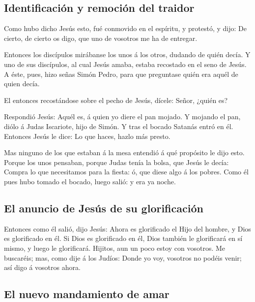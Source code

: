\hypertarget{identificaciuxf3n-y-remociuxf3n-del-traidor}{%
\subsection{Identificación y remoción del
traidor}\label{identificaciuxf3n-y-remociuxf3n-del-traidor}}

 Como hubo dicho Jesús esto, fué conmovido en el
espíritu, y protestó, y dijo: De cierto, de cierto os digo, que uno de
vosotros me ha de entregar.

 Entonces los discípulos mirábanse los unos á los otros,
dudando de quién decía.  Y uno de sus discípulos, al cual
Jesús amaba, estaba recostado en el seno de Jesús.  A
éste, pues, hizo señas Simón Pedro, para que preguntase quién era aquél
de quien decía.

 El entonces recostándose sobre el pecho de Jesús,
dícele: Señor, ¿quién es?

 Respondió Jesús: Aquél es, á quien yo diere el pan
mojado. Y mojando el pan, diólo á Judas Iscariote, hijo de Simón.
 Y tras el bocado Satanás entró en él. Entonces Jesús le
dice: Lo que haces, hazlo más presto.

 Mas ninguno de los que estaban á la mesa entendió á qué
propósito le dijo esto.  Porque los unos pensaban, porque
Judas tenía la bolsa, que Jesús le decía: Compra lo que necesitamos para
la fiesta: ó, que diese algo á los pobres.  Como él pues
hubo tomado el bocado, luego salió: y era ya noche.

\hypertarget{el-anuncio-de-jesuxfas-de-su-glorificaciuxf3n}{%
\subsection{El anuncio de Jesús de su
glorificación}\label{el-anuncio-de-jesuxfas-de-su-glorificaciuxf3n}}

 Entonces como él salió, dijo Jesús: Ahora es glorificado
el Hijo del hombre, y Dios es glorificado en él.  Si Dios
es glorificado en él, Dios también le glorificará en sí mismo, y luego
le glorificará.  Hijitos, aun un poco estoy con vosotros.
Me buscaréis; mas, como dije á los Judíos: Donde yo voy, vosotros no
podéis venir; así digo á vosotros ahora.

\hypertarget{el-nuevo-mandamiento-de-amar}{%
\subsection{El nuevo mandamiento de
amar}\label{el-nuevo-mandamiento-de-amar}}

